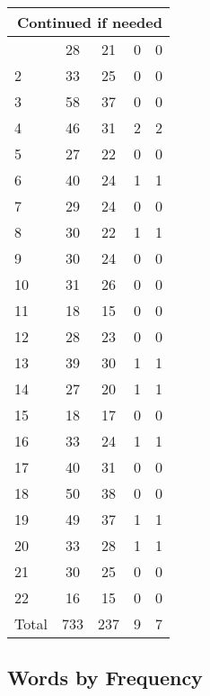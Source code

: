 \begin{center}
\begin{longtable}{l|c|c|c|c}
\hline \multicolumn{5}{|r|}{{Continued if needed}} \\ \hline
\endfoot 
1 & 28 & 21 & 0 & 0\\ \hline
2 & 33 & 25 & 0 & 0\\ \hline
3 & 58 & 37 & 0 & 0\\ \hline
4 & 46 & 31 & 2 & 2\\ \hline
5 & 27 & 22 & 0 & 0\\ \hline
6 & 40 & 24 & 1 & 1\\ \hline
7 & 29 & 24 & 0 & 0\\ \hline
8 & 30 & 22 & 1 & 1\\ \hline
9 & 30 & 24 & 0 & 0\\ \hline
10 & 31 & 26 & 0 & 0\\ \hline
11 & 18 & 15 & 0 & 0\\ \hline
12 & 28 & 23 & 0 & 0\\ \hline
13 & 39 & 30 & 1 & 1\\ \hline
14 & 27 & 20 & 1 & 1\\ \hline
15 & 18 & 17 & 0 & 0\\ \hline
16 & 33 & 24 & 1 & 1\\ \hline
17 & 40 & 31 & 0 & 0\\ \hline
18 & 50 & 38 & 0 & 0\\ \hline
19 & 49 & 37 & 1 & 1\\ \hline
20 & 33 & 28 & 1 & 1\\ \hline
21 & 30 & 25 & 0 & 0\\ \hline
22 & 16 & 15 & 0 & 0\\ \hline
\hline \hline
Total & 733 & 237 & 9 & 7



\end{longtable}
\end{center}

 
\subsection{Words by Frequency}

